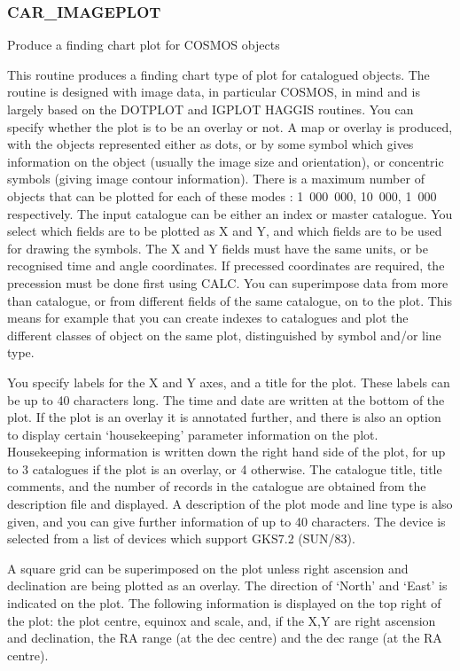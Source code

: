 \subsubsection{CAR\_IMAGEPLOT}

Produce a finding chart plot for COSMOS objects

This routine produces a finding chart type of plot for catalogued
objects.  
The routine is designed with image data, in particular COSMOS, in mind 
and is largely based on the DOTPLOT and IGPLOT HAGGIS routines.   
You can specify whether the plot is to be an overlay or not.
A map or overlay is produced, with the objects represented either as 
dots, or by some symbol which gives information on the object (usually 
the image size and orientation), or concentric symbols (giving image 
contour information).  
There is a maximum number of objects that can be plotted for each of
these modes : 1~000~000, 10~000, 1~000 respectively.
The input catalogue can be either an index or master catalogue. 
You select which fields are to be plotted as X and Y, and which
fields are to be used for drawing the symbols.  
The X and Y fields must have the same units, or be recognised time and 
angle coordinates.
If precessed coordinates are required, the precession must be done first 
using CALC.
You can superimpose data from more than catalogue, or from
different fields of the same catalogue, on to the plot.  
This means for example that you can create indexes to catalogues 
and plot the different classes of object on the same plot, distinguished 
by symbol and/or line type.
  
You specify labels for the X and Y axes, and a title for the plot.  
These labels can be up to 40 characters long.  
The time and date are written at the bottom of the plot. 
If the plot is an overlay it is annotated further, and there is also an 
option to display certain `housekeeping' parameter information on the plot.
Housekeeping information is written down the right hand side of the
plot, for up to 3 catalogues if the plot is an overlay, or 4 otherwise.  
The catalogue title, title comments, and the number of records in the 
catalogue are obtained from the description file and displayed.  
A description of the plot mode and line type is also given, and you
can give further information of up to 40 characters.
The device is selected from a list of devices which support GKS7.2 (SUN/83).

A square grid can be superimposed on the plot unless right ascension
and declination are being plotted as an overlay.
The direction of `North' and `East' is indicated on the plot.  
The following information is displayed on the top right of the plot: the
plot centre, equinox and scale, and, if the X,Y are right ascension
and declination, the RA range (at the dec centre) and the dec range
(at the RA centre).

